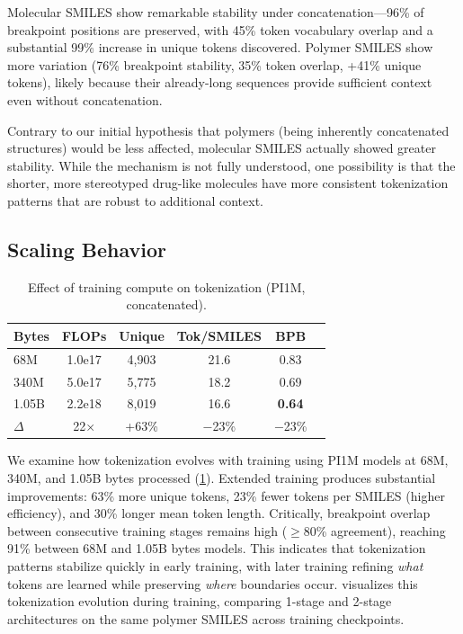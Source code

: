 \documentclass{article}
\newcommand{\bpb}{BPB}
\begin{document}
Molecular SMILES show remarkable stability under concatenation---96\% of breakpoint positions are preserved, with 45\% token vocabulary overlap and a substantial 99\% increase in unique tokens discovered. Polymer SMILES show more variation (76\% breakpoint stability, 35\% token overlap, +41\% unique tokens), likely because their already-long sequences provide sufficient context even without concatenation.

Contrary to our initial hypothesis that polymers (being inherently concatenated structures) would be less affected, molecular SMILES actually showed greater stability. While the mechanism is not fully understood, one possibility is that the shorter, more stereotyped drug-like molecules have more consistent tokenization patterns that are robust to additional context.

\subsection{Scaling Behavior}

\begin{table}[t]
\caption{Effect of training compute on tokenization (PI1M, concatenated).}
\label{tab:training}
\vskip 0.1in
\begin{center}
\begin{small}
\begin{tabular}{lccccc}
\toprule
Bytes & FLOPs & Unique & Tok/SMILES & \bpb{} \\
\midrule
68M & 1.0e17 & 4,903 & 21.6 & 0.83 \\
340M & 5.0e17 & 5,775 & 18.2 & 0.69 \\
1.05B & 2.2e18 & 8,019 & 16.6 & \textbf{0.64} \\
\midrule
$\Delta$ & 22$\times$ & +63\% & $-$23\% & $-$23\% \\
\bottomrule
\end{tabular}
\end{small}
\end{center}
\vskip -0.1in
\end{table}

We examine how tokenization evolves with training using PI1M models at 68M, 340M, and 1.05B bytes processed (\cref{tab:training}). Extended training produces substantial improvements: 63\% more unique tokens, 23\% fewer tokens per SMILES (higher efficiency), and 30\% longer mean token length. Critically, breakpoint overlap between consecutive training stages remains high ($\geq$80\% agreement), reaching 91\% between 68M and 1.05B bytes models. This indicates that tokenization patterns stabilize quickly in early training, with later training refining \emph{what} tokens are learned while preserving \emph{where} boundaries occur.  visualizes this tokenization evolution during training, comparing 1-stage and 2-stage architectures on the same polymer SMILES across training checkpoints.
\end{document}
